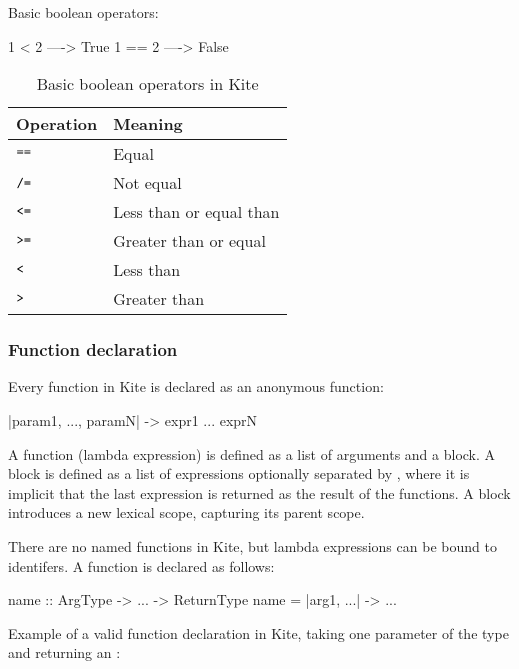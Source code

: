 Basic boolean operators:
\begin{kite}
1 < 2  ----> True
1 == 2 ----> False
\end{kite}

\begin{table}[H]
  \centering
  \begin{tabular}{ll}
    \textbf{Operation} & \textbf{Meaning} \\ \hline
    $\texttt{==}$ & Equal                   \\ \hline
    $\texttt{/=}$ & Not equal               \\ \hline
    $\texttt{<=}$ & Less than or equal than \\ \hline
    $\texttt{>=}$ & Greater than or equal   \\ \hline
    $\texttt{<}$  & Less than               \\ \hline
    $\texttt{>}$  & Greater than            \\ \hline
  \end{tabular}
  \caption{Basic boolean operators in Kite}
\label{tbl:kite-disign-bool-op}
\end{table}


\subsubsection{Function declaration}
\label{sec:func-decl}
Every function in Kite is declared as an anonymous function:

\begin{kite}
|param1, ..., paramN| -> {
  expr1
  ...
  exprN
}
\end{kite}

A function (lambda expression) is defined as a list of arguments and a block. A block is defined as a list of expressions optionally separated by \code{;}, where it is implicit that the last expression is returned as the result of the functions. A block introduces a new lexical scope, capturing its parent scope.

There are no named functions in Kite, but lambda expressions can be bound to identifers. A function is declared as follows:

\begin{kite}
name :: ArgType -> ... -> ReturnType
name = |arg1, ...| -> { ... }
\end{kite}

Example of a valid function declaration in Kite, taking one parameter of the type  and returning an :

